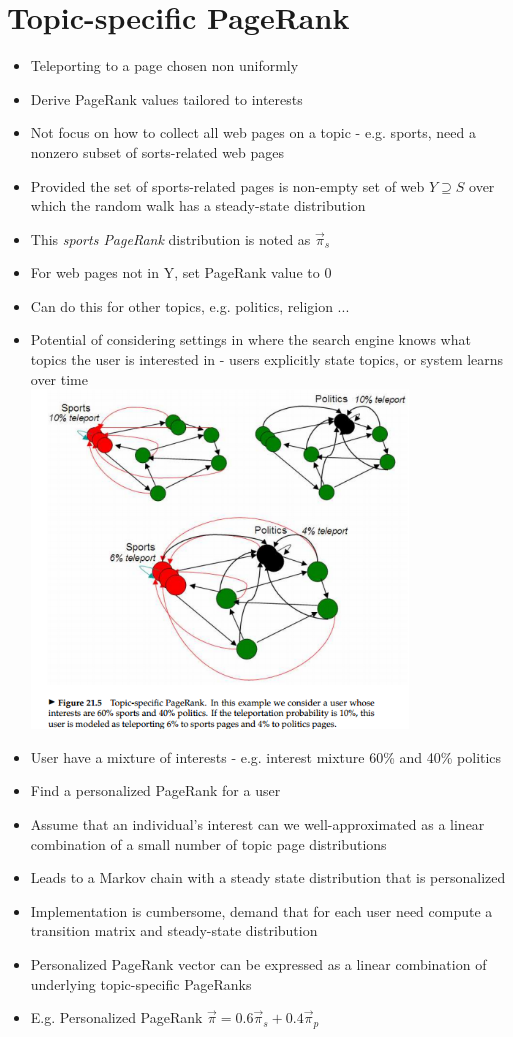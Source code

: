 \documentclass[11pt]{report}
\begin{document}
\section{Topic-specific PageRank}
\begin{itemize}
\item Teleporting to a page chosen non uniformly
\item Derive PageRank values tailored to interests
\item Not focus on how to collect all web pages on a topic - e.g. sports, need a nonzero subset of sorts-related web pages
\item Provided the set of sports-related pages is non-empty set of web $Y\supseteq S$ over which the random walk has a steady-state distribution
\item This \textit{sports PageRank} distribution is noted as $\vec{\pi}_s$
\item For web pages not in Y, set PageRank value to 0
\item Can do this for other topics, e.g. politics, religion ... 
\item Potential of considering settings in where the search engine knows what topics the user is interested in - users explicitly state topics, or system learns over time\\
\includegraphics[width = 10cm]{Topic-specific_PageRank_Manning.png}
\item User have a mixture of interests - e.g. interest mixture 60\% and 40\% politics
\item Find a personalized PageRank for a user
\item Assume that an individual's interest can we well-approximated as a linear combination of a small number of topic page distributions
\item Leads to a Markov chain with a steady state distribution that is personalized
\item Implementation is cumbersome, demand that for each user need compute a transition matrix and steady-state distribution
\item Personalized PageRank vector can be expressed as a linear combination of underlying topic-specific PageRanks
\item E.g. Personalized PageRank $\vec{\pi} = 0.6\vec{\pi}_s + 0.4\vec{\pi}_p$ 
\end{itemize}
\end{document}
